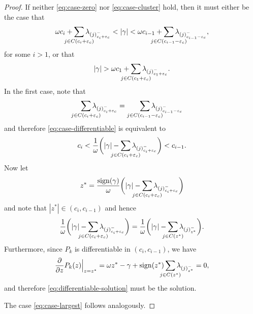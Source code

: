 \begin{proof}
  If neither \eqref{eq:case-zero} nor \eqref{eq:case-cluster} hold, then it must either be
  the case that
  \begin{equation}
    \label{eq:case-differentiable}
    \omega c_i + \smashoperator{\sum_{j \in C(c_i + {\varepsilon_c})}} \lambda_{(j)^-_{c_i + {\varepsilon_c}}}
    < |\gamma| <
    \omega c_{i - 1} + \smashoperator{\sum_{j \in C(c_{i - 1} - {\varepsilon_c})}} \lambda_{(j)^-_{c_{i - 1} - {\varepsilon_c}}},
  \end{equation}
  for some \(i > 1\), or that
  \begin{equation}
    \label{eq:case-largest}
    |\gamma| > \omega c_1 + \smashoperator{\sum_{j \in C(c_1 + {\varepsilon_c})}} \lambda_{(j)^-_{c_1 + {\varepsilon_c}}}.
  \end{equation}
  In the first case, note that
  \[
    \smashoperator{\sum_{j \in C(c_i + {\varepsilon_c})}} \lambda_{(j)^-_{c_i + {\varepsilon_c}}}
    =
    \smashoperator[r]{\sum_{j \in C(c_{i-1} - {\varepsilon_c})}} \lambda_{(j)^-_{c_{i-1} - {\varepsilon_c}}}
  \]
  and therefore \eqref{eq:case-differentiable} is equivalent to
  \[
    c_i < \frac{1}{\omega} \bigg( |\gamma| - \smashoperator{\sum_{j \in C(c_i + {\varepsilon_c})}} \lambda_{(j)^-_{c_i + {\varepsilon_c}}} \bigg) < c_{i -1}.
  \]
  Now let
  \begin{equation}
    \label{eq:differentiable-solution}
    z^* = \frac{\sign(\gamma)}{\omega} \bigg( |\gamma| - \smashoperator{\sum_{j \in C(c_i + {\varepsilon_c})}} \lambda_{(j)^-_{c_i + {\varepsilon_c}}} \bigg)
  \end{equation}
  and note that \(|z^*| \in (c_i, c_{i-1})\) and hence
  \[
    \frac{1}{\omega} \bigg( |\gamma| - \smashoperator{\sum_{j \in C(c_i + {\varepsilon_c})}} \lambda_{(j)^-_{c_i + {\varepsilon_c}}} \bigg)
    =
    \frac{1}{\omega} \bigg( |\gamma| - \smashoperator{\sum_{j \in C(z^*)}} \lambda_{(j)^-_{z^*}} \bigg).
  \]
  Furthermore, since \(P_k\) is differentiable in \((c_i, c_{i-1})\), we have
  \[
    \frac{\partial}{\partial z} P_k(z) \Big|_{z = z^*}
    = \omega z^* - \gamma + \sign(z^*) \smashoperator{\sum_{j \in C(z^*)}} \lambda_{(j)^-_{z^*}} = 0,
  \]
  and therefore \eqref{eq:differentiable-solution} must be the solution.

  The case \eqref{eq:case-largest} follows analogously.
\end{proof}


